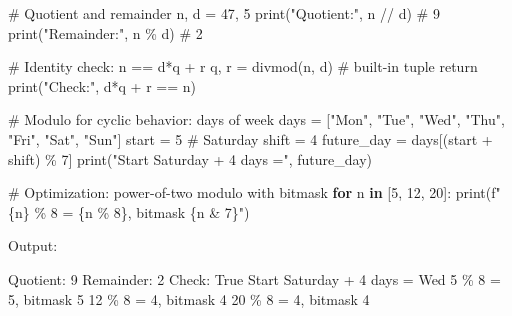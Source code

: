\documentclass[
  letterpaper,
  DIV=11,
  numbers=noendperiod]{scrreprt}
\newenvironment{Shaded}{\begin{snugshade}}{\end{snugshade}}
\newcommand{\BuiltInTok}[1]{\textcolor[rgb]{0.00,0.23,0.31}{#1}}
\newcommand{\CommentTok}[1]{\textcolor[rgb]{0.37,0.37,0.37}{#1}}
\newcommand{\ControlFlowTok}[1]{\textcolor[rgb]{0.00,0.23,0.31}{\textbf{#1}}}
\newcommand{\DecValTok}[1]{\textcolor[rgb]{0.68,0.00,0.00}{#1}}
\newcommand{\ExtensionTok}[1]{\textcolor[rgb]{0.00,0.23,0.31}{#1}}
\newcommand{\KeywordTok}[1]{\textcolor[rgb]{0.00,0.23,0.31}{\textbf{#1}}}
\newcommand{\NormalTok}[1]{\textcolor[rgb]{0.00,0.23,0.31}{#1}}
\newcommand{\OperatorTok}[1]{\textcolor[rgb]{0.37,0.37,0.37}{#1}}
\newcommand{\SpecialCharTok}[1]{\textcolor[rgb]{0.37,0.37,0.37}{#1}}
\newcommand{\SpecialStringTok}[1]{\textcolor[rgb]{0.13,0.47,0.30}{#1}}
\newcommand{\StringTok}[1]{\textcolor[rgb]{0.13,0.47,0.30}{#1}}
\begin{document}
\begin{Shaded}
\begin{Highlighting}[]
\CommentTok{\# Quotient and remainder}
\NormalTok{n, d }\OperatorTok{=} \DecValTok{47}\NormalTok{, }\DecValTok{5}
\BuiltInTok{print}\NormalTok{(}\StringTok{"Quotient:"}\NormalTok{, n }\OperatorTok{//}\NormalTok{ d)  }\CommentTok{\# 9}
\BuiltInTok{print}\NormalTok{(}\StringTok{"Remainder:"}\NormalTok{, n }\OperatorTok{\%}\NormalTok{ d)  }\CommentTok{\# 2}

\CommentTok{\# Identity check: n == d*q + r}
\NormalTok{q, r }\OperatorTok{=} \BuiltInTok{divmod}\NormalTok{(n, d)  }\CommentTok{\# built{-}in tuple return}
\BuiltInTok{print}\NormalTok{(}\StringTok{"Check:"}\NormalTok{, d}\OperatorTok{*}\NormalTok{q }\OperatorTok{+}\NormalTok{ r }\OperatorTok{==}\NormalTok{ n)}

\CommentTok{\# Modulo for cyclic behavior: days of week}
\NormalTok{days }\OperatorTok{=}\NormalTok{ [}\StringTok{"Mon"}\NormalTok{, }\StringTok{"Tue"}\NormalTok{, }\StringTok{"Wed"}\NormalTok{, }\StringTok{"Thu"}\NormalTok{, }\StringTok{"Fri"}\NormalTok{, }\StringTok{"Sat"}\NormalTok{, }\StringTok{"Sun"}\NormalTok{]}
\NormalTok{start }\OperatorTok{=} \DecValTok{5}  \CommentTok{\# Saturday}
\NormalTok{shift }\OperatorTok{=} \DecValTok{4}
\NormalTok{future\_day }\OperatorTok{=}\NormalTok{ days[(start }\OperatorTok{+}\NormalTok{ shift) }\OperatorTok{\%} \DecValTok{7}\NormalTok{]}
\BuiltInTok{print}\NormalTok{(}\StringTok{"Start Saturday + 4 days ="}\NormalTok{, future\_day)}

\CommentTok{\# Optimization: power{-}of{-}two modulo with bitmask}
\ControlFlowTok{for}\NormalTok{ n }\KeywordTok{in}\NormalTok{ [}\DecValTok{5}\NormalTok{, }\DecValTok{12}\NormalTok{, }\DecValTok{20}\NormalTok{]:}
    \BuiltInTok{print}\NormalTok{(}\SpecialStringTok{f"}\SpecialCharTok{\{}\NormalTok{n}\SpecialCharTok{\}}\SpecialStringTok{ \% 8 = }\SpecialCharTok{\{}\NormalTok{n }\OperatorTok{\%} \DecValTok{8}\SpecialCharTok{\}}\SpecialStringTok{, bitmask }\SpecialCharTok{\{}\NormalTok{n }\OperatorTok{\&} \DecValTok{7}\SpecialCharTok{\}}\SpecialStringTok{"}\NormalTok{)}
\end{Highlighting}
\end{Shaded}

Output:

\begin{Shaded}
\begin{Highlighting}[]
\ExtensionTok{Quotient:}\NormalTok{ 9}
\ExtensionTok{Remainder:}\NormalTok{ 2}
\ExtensionTok{Check:}\NormalTok{ True}
\ExtensionTok{Start}\NormalTok{ Saturday + 4 days = Wed}
\ExtensionTok{5}\NormalTok{ \% 8 = 5, bitmask 5}
\ExtensionTok{12}\NormalTok{ \% 8 = 4, bitmask 4}
\ExtensionTok{20}\NormalTok{ \% 8 = 4, bitmask 4}
\end{Highlighting}
\end{Shaded}
\end{document}
